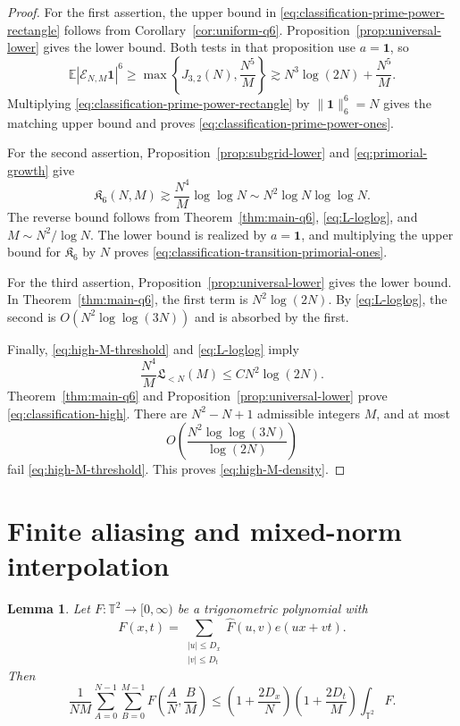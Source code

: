 \documentclass[11pt, twoside]{article}
\numberwithin{equation}{section}
\newtheorem{lemma}[theorem]{Lemma}
\theoremstyle{definition}
\newcommand{\T}{\mathbb T}
\newcommand{\E}{\mathbb E}
\newcommand{\cE}{\mathcal E}
\newcommand{\ind}{\mathbf 1}
\newcommand{\Lcal}{\mathfrak L}
\newcommand{\Ksix}{\mathfrak K_6}
\begin{document}
\begin{proof}
For the first assertion, the upper bound in
\eqref{eq:classification-prime-power-rectangle} follows from
Corollary~\ref{cor:uniform-q6}.  Proposition~\ref{prop:universal-lower}
gives the lower bound.  Both tests in that proposition use $a=\ind$, so
$$
\E|\cE_{N,M}\ind|^6
\geq
\max\left\{J_{3,2}(N),\frac{N^5}{M}\right\}
\gtrsim N^3\log(2N)+\frac{N^5}{M}.
$$
Multiplying \eqref{eq:classification-prime-power-rectangle} by
$\|\ind\|_6^6=N$ gives the matching upper bound and proves
\eqref{eq:classification-prime-power-ones}.

For the second assertion, Proposition~\ref{prop:subgrid-lower} and
\eqref{eq:primorial-growth} give
$$
\Ksix(N,M)
\gtrsim\frac{N^4}{M}\log\log N
\sim N^2\log N\log\log N.
$$
The reverse bound follows from Theorem~\ref{thm:main-q6},
\eqref{eq:L-loglog}, and $M\sim N^2/\log N$.  The lower bound is realized
by $a=\ind$, and multiplying the upper bound for $\Ksix$ by $N$ proves
\eqref{eq:classification-transition-primorial-ones}.

For the third assertion, Proposition~\ref{prop:universal-lower} gives the
lower bound.  In Theorem~\ref{thm:main-q6}, the first term is $N^2\log(2N)$.
By \eqref{eq:L-loglog}, the second is $O(N^2\log\log(3N))$ and is absorbed
by the first.

Finally, \eqref{eq:high-M-threshold} and \eqref{eq:L-loglog} imply
$$
\frac{N^4}{M}\Lcal_{<N}(M)\leq CN^2\log(2N).
$$
Theorem~\ref{thm:main-q6} and Proposition~\ref{prop:universal-lower} prove
\eqref{eq:classification-high}.  There are $N^2-N+1$ admissible integers
$M$, and at most
$$
O\left(\frac{N^2\log\log(3N)}{\log(2N)}\right)
$$
fail \eqref{eq:high-M-threshold}.  This proves \eqref{eq:high-M-density}.
\end{proof}

\section{Finite aliasing and mixed-norm interpolation}
\label{sec:interpolation}

\begin{lemma}
\label{lem:alias}
Let $F:\T^2\to[0,\infty)$ be a trigonometric polynomial with
$$
F(x,t)=
\sum_{\substack{|u|\leq D_x\\|v|\leq D_t}}
\widehat F(u,v)e(ux+vt).
$$
Then
\begin{equation}\label{eq:alias}
\frac1{NM}\sum_{A=0}^{N-1}\sum_{B=0}^{M-1}F\left(\frac AN,\frac BM\right)
\leq
\left(1+\frac{2D_x}{N}\right)
\left(1+\frac{2D_t}{M}\right)
\int_{\T^2}F.
\end{equation}
\end{lemma}
\end{document}

